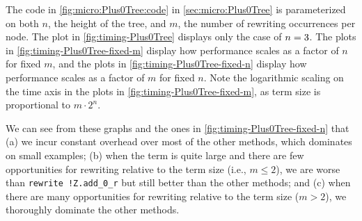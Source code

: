 \documentclass[a4paper,USenglish,cleveref,autoref,thm-restate]{lipics-v2021}
\begin{document}

The code in \autoref{fig:micro:Plus0Tree:code} in \autoref{sec:micro:Plus0Tree} is parameterized on both $n$, the height of the tree, and $m$, the number of rewriting occurrences per node.
The plot in \autoref{fig:timing-Plus0Tree} displays only the case of $n=3$.
The plots in \autoref{fig:timing-Plus0Tree-fixed-m} display how performance scales as a factor of $n$ for fixed $m$, and the plots in \autoref{fig:timing-Plus0Tree-fixed-n} display how performance scales as a factor of $m$ for fixed $n$.
Note the logarithmic scaling on the time axis in the plots in \autoref{fig:timing-Plus0Tree-fixed-m}, as term size is proportional to $m\cdot 2^n$.

We can see from these graphs and the ones in \autoref{fig:timing-Plus0Tree-fixed-n} that
(a) we incur constant overhead over most of the other methods, which dominates on small examples;
(b) when the term is quite large and there are few opportunities for rewriting relative to the term size (i.e., $m \le 2$), we are worse than \texttt{rewrite !Z.add_0_r} but still better than the other methods; and
(c) when there are many opportunities for rewriting relative to the term size ($m > 2$), we thoroughly dominate the other methods.
\end{document}
